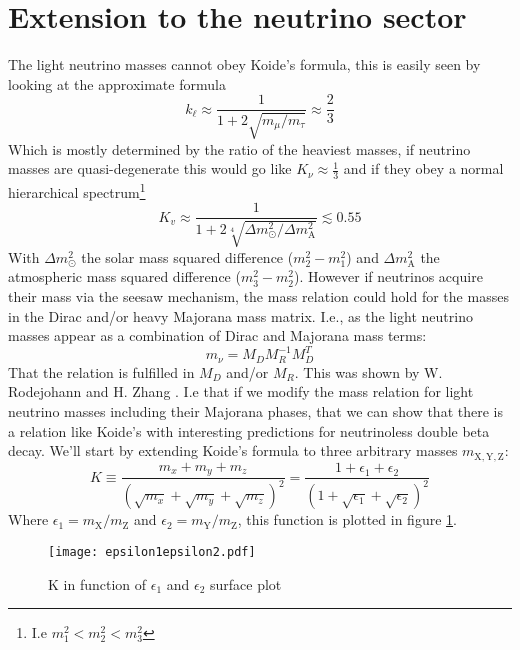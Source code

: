 \documentclass[twoside,twocolumn,11pt]{article} %
\begin{document}
\section{Extension to the neutrino sector}
The light neutrino masses cannot obey Koide's formula, this is easily seen by looking at the approximate formula
\begin{equation}
	k_\ell \approx \frac{1}{1+2\sqrt{m_\mu/m_\tau}} \approx \frac{2}{3}
\end{equation}
Which is mostly determined by the ratio of the heaviest masses, if neutrino masses are quasi-degenerate this would go like $K_\nu \approx \frac{1}{3}$ and if they obey a normal hierarchical spectrum\footnote{I.e $m_1^2<m_2^2<m_3^2$}
\begin{equation}
	K_{v} \approx \frac{1}{1+2 \sqrt[4]{\Delta m_{\odot}^{2} / \Delta m_{\mathrm{A}}^{2}}} \lesssim 0.55
\end{equation}
With $\Delta m_\odot^2$ the solar mass squared difference ($m_2^2 - m_1^2$) and $\Delta m_\mathrm{A}^2$ the atmospheric mass squared difference ($m_3^2 - m_2^2$). However if neutrinos acquire their mass via the seesaw mechanism, the mass relation could hold for the masses in the Dirac and/or heavy Majorana mass matrix. I.e., as the light neutrino masses appear as a combination of Dirac and Majorana mass terms: 
\begin{equation}
	m_\nu = M_D M_R^{-1} M_D^T
\end{equation}
That the relation is fulfilled in $M_D$ and/or $M_R$.
This was shown by W. Rodejohann and H. Zhang \cite{NeutrinoExtension}. I.e that if we modify the mass relation for light neutrino masses including their Majorana phases, that we can show that there is a relation like Koide's with interesting predictions for neutrinoless double beta decay. We'll start by extending Koide's formula to three arbitrary masses $m_{\mathrm{X},\mathrm{Y},\mathrm{Z}}$:
\begin{equation*}
	K \equiv \frac{m_{x}+m_{y}+m_{z}}{\left(\sqrt{m_{x}}+\sqrt{m_{y}}+\sqrt{m_{z}}\right)^{2}}=\frac{1+\epsilon_{1}+\epsilon_{2}}{\left(1+\sqrt{\epsilon_{1}}+\sqrt{\epsilon_{2}}\right)^{2}}
\end{equation*}
Where $\epsilon_1 = m_\mathrm{X}/m_\mathrm{Z}$ and $\epsilon_2 = m_\mathrm{Y}/m_\mathrm{Z}$, this function is plotted in figure \ref{fig:epsilon1epsilon2}.
\begin{figure}
	\centering
	\texttt{[image: epsilon1epsilon2.pdf]}
	\caption{K in function of $\epsilon_{1}$ and $\epsilon_{2}$ surface plot}
	\label{fig:epsilon1epsilon2}
\end{figure}
\end{document}
